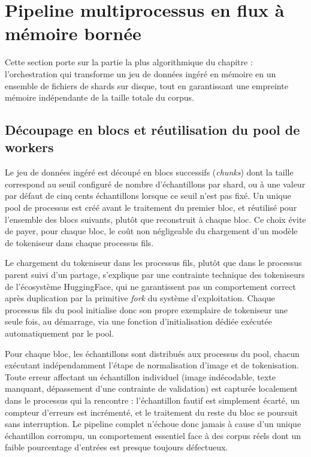 \documentclass[12pt,a4paper]{report}
\begin{document}
\section{Pipeline multiprocessus en flux à mémoire bornée}
\label{sec:pipeline_streaming}

Cette section porte sur la partie la plus algorithmique du chapitre : l'orchestration qui transforme un jeu de données ingéré en mémoire en un ensemble de fichiers de shards sur disque, tout en garantissant une empreinte mémoire indépendante de la taille totale du corpus.

\subsection{Découpage en blocs et réutilisation du pool de workers}

Le jeu de données ingéré est découpé en blocs successifs (\textit{chunks}) dont la taille correspond au seuil configuré de nombre d'échantillons par shard, ou à une valeur par défaut de cinq cents échantillons lorsque ce seuil n'est pas fixé. Un unique pool de processus est créé avant le traitement du premier bloc, et réutilisé pour l'ensemble des blocs suivants, plutôt que reconstruit à chaque bloc. Ce choix évite de payer, pour chaque bloc, le coût non négligeable du chargement d'un modèle de tokeniseur dans chaque processus fils.

Le chargement du tokeniseur dans les processus fils, plutôt que dans le processus parent suivi d'un partage, s'explique par une contrainte technique des tokeniseurs de l'écosystème HuggingFace, qui ne garantissent pas un comportement correct après duplication par la primitive \textit{fork} du système d'exploitation. Chaque processus fils du pool initialise donc son propre exemplaire de tokeniseur une seule fois, au démarrage, via une fonction d'initialisation dédiée exécutée automatiquement par le pool.

Pour chaque bloc, les échantillons sont distribués aux processus du pool, chacun exécutant indépendamment l'étape de normalisation d'image et de tokenisation. Toute erreur affectant un échantillon individuel (image indécodable, texte manquant, dépassement d'une contrainte de validation) est capturée localement dans le processus qui la rencontre : l'échantillon fautif est simplement écarté, un compteur d'erreurs est incrémenté, et le traitement du reste du bloc se poursuit sans interruption. Le pipeline complet n'échoue donc jamais à cause d'un unique échantillon corrompu, un comportement essentiel face à des corpus réels dont un faible pourcentage d'entrées est presque toujours défectueux.
\end{document}
